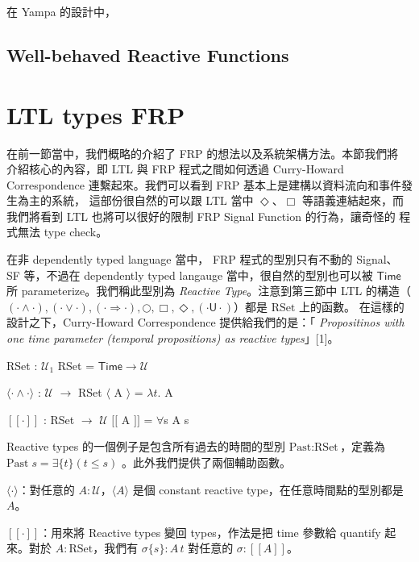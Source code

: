 \documentclass{article}
\newcommand{\llens}{[\![}
\newcommand{\rlens}{]\!]}
\newcommand{\Time}{\mathsf{Time}}
\newcommand{\TU}{\mathsf{U}}
\newcommand{\U}{\mathcal{U}}
\newcommand{\Gs}{\sigma}
\begin{document}
  在 Yampa 的設計中，

  \subsection{Well-behaved Reactive Functions}
\section{LTL types FRP}
  在前一節當中，我們概略的介紹了 FRP 的想法以及系統架構方法。本節我們將
  介紹核心的內容，即 LTL 與 FRP 程式之間如何透過 Curry-Howard Correspondence
  連繫起來。我們可以看到 FRP 基本上是建構以資料流向和事件發生為主的系統，
  這部份很自然的可以跟 LTL 當中 $\Diamond$、$\Box$ 等語義連結起來，而
  我們將看到 LTL 也將可以很好的限制 FRP Signal Function 的行為，讓奇怪的
  程式無法 type check。

  在非 dependently typed language 當中， FRP 程式的型別只有不動的 Signal、
  SF 等，不過在 dependently typed langauge 當中，很自然的型別也可以被 $\Time$
  所 parameterize。我們稱此型別為 \emph{Reactive Type}。注意到第三節中
  LTL 的構造（$(\cdot\land\cdot), (\cdot\lor\cdot), (\cdot\Rightarrow\cdot),\bigcirc,\Box,\Diamond,(\cdot\TU\cdot)$）都是 $\text{RSet}$ 上的函數。
  在這樣的設計之下，Curry-Howard Correspondence 提供給我們的是：「
  \emph{Propositinos with one time parameter (temporal propositions) as reactive types}」[1]。

  \begin{code}
  RSet : $\U_1$
  RSet = $\Time\to\U$

  $\langle\cdot\land\cdot\rangle$ : $\U$ $\to$ RSet
  $\langle$ A $\rangle$ = $\lambda t.$ A

  $\llens\cdot\rlens$ : RSet $\to$ $\U$
  $\llens$ A $\rlens$ = $\forall${s} A s
  \end{code}

  Reactive types 的一個例子是包含所有過去的時間的型別
  $\text{Past} : \text{RSet}$，定義為 $\text{Past}\; s = \exists\{t\} (t\le s)$
  。此外我們提供了兩個輔助函數。
  \begin{enumerate*}
    \item $\langle\cdot\rangle$：對任意的 $A:\U$，$\langle A\rangle$ 是個
    constant reactive type，在任意時間點的型別都是 $A$。
    \item $\llens\cdot\rlens$：用來將 Reactive types 變回 types，作法是把
    time 參數給 quantify 起來。對於 $A:\text{RSet}$，我們有 $\Gs\{s\}:A\,t$
    對任意的 $\Gs:\llens A\rlens$。
  \end{enumerate*}
\end{document}
